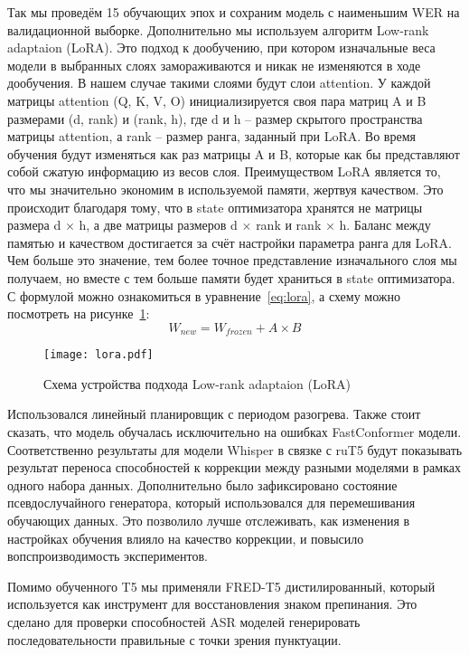 Так мы проведём 15 обучающих эпох и сохраним модель с наименьшим WER на валидационной выборке.
Дополнительно мы используем алгоритм Low-rank adaptaion (LoRA)\cite{hu2022lora}.
Это подход к дообучению, при котором изначальные веса модели в выбранных слоях замораживаются и никак не изменяются в ходе дообучения.
В нашем случае такими слоями будут слои attention.
У каждой матрицы attention (Q, K, V, O) инициализируется своя пара матриц A и B размерами (d, rank) и (rank, h), где d и h – размер скрытого пространства матрицы attention, а rank – размер ранга, заданный при LoRA.
Во время обучения будут изменяться как раз матрицы A и B, которые как бы представляют собой сжатую информацию из весов слоя.
Преимуществом LoRA является то, что мы значительно экономим в используемой памяти, жертвуя качеством.
Это происходит благодаря тому, что в state оптимизатора хранятся не матрицы размера d $\times$ h, а две матрицы размеров d $\times$ rank и rank $\times$ h.
Баланс между памятью и качеством достигается за счёт настройки параметра ранга для LoRA.
Чем больше это значение, тем более точное представление изначального слоя мы получаем, но вместе с тем больше памяти будет храниться в state оптимизатора.
С формулой можно ознакомиться в уравнение~\ref{eq:lora}, а схему можно посмотреть на рисунке~\ref{fig:lora}:
\begin{equation}
  W_{new} = W_{frozen} + A \times B
  \label{eq:lora}
\end{equation}

\begin{figure}[!t]
  \centering
  \texttt{[image: lora.pdf]}
  \caption{Схема устройства подхода Low-rank adaptaion (LoRA)}
  \label{fig:lora}
\end{figure}

Использовался линейный планировщик с периодом разогрева.
Также стоит сказать, что модель обучалась исключительно на ошибках FastConformer модели.
Соответственно результаты для модели Whisper в связке с ruT5 будут показывать результат переноса способностей к коррекции между разными моделями в рамках одного набора данных.
Дополнительно было зафиксировано состояние псевдослучайного генератора, который использовался для перемешивания обучающих данных.
Это позволило лучше отслеживать, как изменения в настройках обучения влияло на качество коррекции, и повысило вопспроизводимость экспериментов.

Помимо обученного T5 мы применяли FRED-T5 дистилированный, который используется как инструмент для восстановления знаком препинания.
Это сделано для проверки способностей ASR моделей генерировать последовательности правильные с точки зрения пунктуации.

